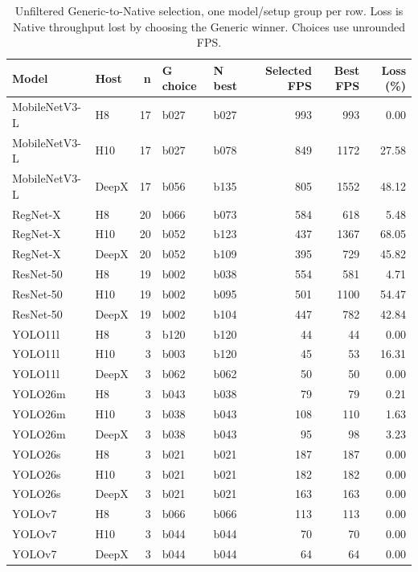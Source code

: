 \begin{table}[t]
\centering
\caption{Unfiltered Generic-to-Native selection, one model/setup group per row. Loss is Native throughput lost by choosing the Generic winner. Choices use unrounded FPS.}
\label{tab:current-selection-groups}
\begingroup\small\setlength{\tabcolsep}{3pt}
\begin{tabular*}{\textwidth}{@{\extracolsep{\fill}}l l r l l r r r@{}}
\toprule
Model & Host & n & G choice & N best & Selected FPS & Best FPS & Loss (\%) \\
\midrule
MobileNetV3-L & H8 & 17 & b027 & b027 & 993 & 993 & 0.00 \\
MobileNetV3-L & H10 & 17 & b027 & b078 & 849 & 1172 & 27.58 \\
MobileNetV3-L & DeepX & 17 & b056 & b135 & 805 & 1552 & 48.12 \\
RegNet-X & H8 & 20 & b066 & b073 & 584 & 618 & 5.48 \\
RegNet-X & H10 & 20 & b052 & b123 & 437 & 1367 & 68.05 \\
RegNet-X & DeepX & 20 & b052 & b109 & 395 & 729 & 45.82 \\
ResNet-50 & H8 & 19 & b002 & b038 & 554 & 581 & 4.71 \\
ResNet-50 & H10 & 19 & b002 & b095 & 501 & 1100 & 54.47 \\
ResNet-50 & DeepX & 19 & b002 & b104 & 447 & 782 & 42.84 \\
YOLO11l & H8 & 3 & b120 & b120 & 44 & 44 & 0.00 \\
YOLO11l & H10 & 3 & b003 & b120 & 45 & 53 & 16.31 \\
YOLO11l & DeepX & 3 & b062 & b062 & 50 & 50 & 0.00 \\
YOLO26m & H8 & 3 & b043 & b038 & 79 & 79 & 0.21 \\
YOLO26m & H10 & 3 & b038 & b043 & 108 & 110 & 1.63 \\
YOLO26m & DeepX & 3 & b038 & b043 & 95 & 98 & 3.23 \\
YOLO26s & H8 & 3 & b021 & b021 & 187 & 187 & 0.00 \\
YOLO26s & H10 & 3 & b021 & b021 & 182 & 182 & 0.00 \\
YOLO26s & DeepX & 3 & b021 & b021 & 163 & 163 & 0.00 \\
YOLOv7 & H8 & 3 & b066 & b066 & 113 & 113 & 0.00 \\
YOLOv7 & H10 & 3 & b044 & b044 & 70 & 70 & 0.00 \\
YOLOv7 & DeepX & 3 & b044 & b044 & 64 & 64 & 0.00 \\
\bottomrule
\end{tabular*}
\endgroup
\end{table}
